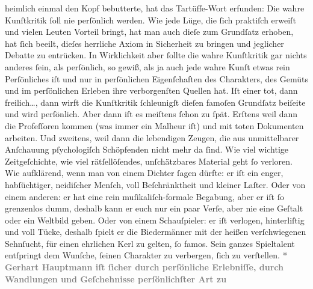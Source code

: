\begin{ledgroupsized}[t]{13cm}
{{                  heimlich einmal den Kopf bebutterte, hat das Tartüffe-Wort erfunden: Die wahre Kunſtkritik ſoll nie
                  perſönlich werden. Wie jede Lüge, die ſich praktiſch erweiſt und vielen Leuten
                  Vorteil bringt, hat man auch dieſe zum Grundſatz erhoben, hat ſich beeilt, dieſes
                  herrliche Axiom in Sicherheit zu bringen und jeglicher Debatte zu entrücken. In
                  Wirklichkeit aber ſollte die wahre Kunſtkritik gar nichts anderes ſein, als
                  perſönlich, so gewiß, als ja auch jede wahre Kunſt etwas rein Perſönliches iſt und
                  nur in perſönlichen Eigenſchaften des Charakters, des Gemüts und im perſönlichen
                  Erleben ihre verborgenſten Quellen hat. Iſt einer tot, dann freilich{\dots}, dann wirft die Kunſtkritik ſchleunigſt dieſen
                  famoſen Grundſatz beiſeite und wird perſönlich. Aber dann iſt es meiſtens ſchon zu
                  ſpät. Erſtens weil dann die Profeſſoren kommen (was immer ein Malheur iſt) und mit
                  toten Dokumenten arbeiten. Und zweitens, weil dann die lebendigen Zeugen, die aus
                  unmittelbarer Anſchauung pſychologiſch Schöpfenden nicht mehr da ſind. Wie viel
                  wichtige Zeitgeſchichte, wie viel rätſellöſendes, unſchätzbares Material geht ſo
                  verloren. Wie aufklärend, wenn man von einem Dichter ſagen dürfte: er iſt ein
                  enger, habſüchtiger, neidiſcher Menſch, voll Beſchränktheit und kleiner Laſter.
                  Oder von einem anderen: er hat eine rein muſikaliſch-formale Begabung, aber er iſt
                  ſo grenzenlos dumm, deshalb kann er euch nur ein paar Verſe, aber nie eine Geſtalt
                  oder ein Weltbild geben. Oder von einem Schauſpieler: er iſt verlogen,
                  hinterliſtig und voll Tücke, deshalb ſpielt er die Biedermänner mit der heißen
                  verſchwiegenen Sehnſucht, für einen ehrlichen Kerl zu gelten, ſo famos. Sein
                  ganzes Spieltalent entſpringt dem Wunſche, ſeinen Charakter zu verbergen, ſich zu
                  verſtellen.}}\pend
           \pstart
           \centering{}\textcolor{gray}{\textbf{*}}\pend
           \pstart
           \noindent{}\textcolor{gray}{\textbf{Gerhart Hauptmann iſt ſicher durch
                  perſönliche Erlebniſſe, durch Wandlungen und Geſchehnisse perſönlichſter Art zu
}}
\end{ledgroupsized}
